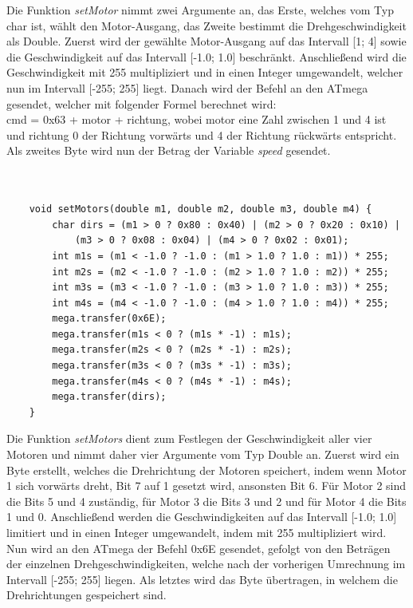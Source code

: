 \documentclass[12pt]{article}
\begin{document}
\vspace{-2mm}
Die Funktion \textit{setMotor} nimmt zwei Argumente an, das Erste, welches vom Typ char ist, wählt den Motor-Ausgang, das Zweite bestimmt die Drehgeschwindigkeit als Double. Zuerst wird der gewählte Motor-Ausgang auf das Intervall [1; 4] sowie die Geschwindigkeit auf das Intervall [-1.0; 1.0] beschränkt. Anschließend wird die Geschwindigkeit mit 255 multipliziert und in einen Integer umgewandelt, welcher nun im Intervall [-255; 255] liegt. Danach wird der Befehl an den ATmega gesendet, welcher mit folgender Formel berechnet wird:\\cmd = 0x63 + motor + richtung, wobei motor eine Zahl zwischen 1 und 4 ist und richtung 0 der Richtung vorwärts und 4 der Richtung rückwärts entspricht. Als zweites Byte wird nun der Betrag der Variable \textit{speed} gesendet.\\\\\\
\begin{verbatim}
    void setMotors(double m1, double m2, double m3, double m4) {
        char dirs = (m1 > 0 ? 0x80 : 0x40) | (m2 > 0 ? 0x20 : 0x10) |
            (m3 > 0 ? 0x08 : 0x04) | (m4 > 0 ? 0x02 : 0x01);
        int m1s = (m1 < -1.0 ? -1.0 : (m1 > 1.0 ? 1.0 : m1)) * 255;
        int m2s = (m2 < -1.0 ? -1.0 : (m2 > 1.0 ? 1.0 : m2)) * 255;
        int m3s = (m3 < -1.0 ? -1.0 : (m3 > 1.0 ? 1.0 : m3)) * 255;
        int m4s = (m4 < -1.0 ? -1.0 : (m4 > 1.0 ? 1.0 : m4)) * 255;
        mega.transfer(0x6E);
        mega.transfer(m1s < 0 ? (m1s * -1) : m1s);
        mega.transfer(m2s < 0 ? (m2s * -1) : m2s);
        mega.transfer(m3s < 0 ? (m3s * -1) : m3s);
        mega.transfer(m4s < 0 ? (m4s * -1) : m4s);
        mega.transfer(dirs);
    }
\end{verbatim}
\vspace{-2mm}
Die Funktion \textit{setMotors} dient zum Festlegen der Geschwindigkeit aller vier Motoren und nimmt daher vier Argumente vom Typ Double an. Zuerst wird ein Byte erstellt, welches die Drehrichtung der Motoren speichert, indem wenn Motor 1 sich vorwärts dreht, Bit 7 auf 1 gesetzt wird, ansonsten Bit 6. Für Motor 2 sind die Bits 5 und 4 zuständig, für Motor 3 die Bits 3 und 2 und für Motor 4 die Bits 1 und 0. Anschließend werden die Geschwindigkeiten auf das Intervall [-1.0; 1.0] limitiert und in einen Integer umgewandelt, indem mit 255 multipliziert wird. Nun wird an den ATmega der Befehl 0x6E gesendet, gefolgt von den Beträgen der einzelnen Drehgeschwindigkeiten, welche nach der vorherigen Umrechnung im Intervall [-255; 255] liegen. Als letztes wird das Byte übertragen, in welchem die Drehrichtungen gespeichert sind.\\
\end{document}
